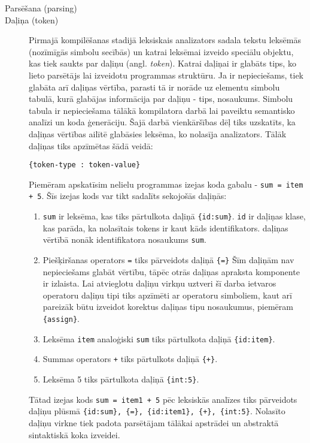 \begin{description}
\item[Parsēšana (parsing)]


\item[Daļiņa (token)]
Pirmajā kompilēšanas stadijā leksiskais analizators sadala tekstu leksēmās (nozīmīgās simbolu secībās) un katrai leksēmai izveido speciālu objektu, kas tiek saukts par daļiņu (angl. \emph{token}). Katrai daļiņai ir glabāts tips, ko lieto parsētājs lai izveidotu programmas struktūru. Ja ir nepieciešams, tiek glabāta arī daļiņas vērtība, parasti tā ir norāde uz elementu simbolu tabulā, kurā glabājas informācija par daļiņu - tips, nosaukums. Simbolu tabula ir nepieciešama tālākā kompilatora darbā lai paveiktu semantisko analīzi un koda ģenerāciju. Šajā darbā vienkāršības dēļ tiks uzskatīts, ka daļiņas vērtības ailītē glabāsies leksēma, ko nolasīja analizators. Tālāk daļiņas tiks apzīmētas šādā veidā:

\begin{verbatim}
{token-type : token-value}
\end{verbatim}

Piemēram apskatīsim nelielu programmas izejas koda gabalu - \verb|sum = item + 5|. Šīs izejas kods var tikt sadalīts sekojošās daļiņās:
\begin{enumerate}
\item \verb|sum| ir leksēma, kas tiks pārtulkota daļiņā \verb|{id:sum}|. \verb|id| ir daļiņas klase, kas parāda, ka nolasītais tokens ir kaut kāds identifikators. daļiņas vērtībā nonāk identifikatora nosaukums \verb|sum|.
\item Piešķiršanas operators \verb|=| tiks pārveidots daļiņā \verb|{=}| Šīm daļiņām nav nepieciešams glabāt vērtību, tāpēc otrās daļiņas apraksta komponente ir izlaista. Lai atvieglotu daļiņu virkņu uztveri šī darba ietvaros operatoru daļiņu tipi tiks apzīmēti ar operatoru simboliem, kaut arī pareizāk būtu izveidot korektus daļiņas tipu nosaukumus, piemēram \verb|{assign}|.
\item Leksēma \verb|item| analoģiski \verb|sum| tiks pārtulkota daļiņā \verb|{id:item}|.
\item Summas operators \verb|+| tiks pārtulkots daļiņā \verb|{+}|.
\item Leksēma 5 tiks pārtulkota daļiņā \verb|{int:5}|.
\end{enumerate}

Tātad izejas kods \verb|sum = item1 + 5| pēc leksiskās analīzes tiks pārveidots daļiņu plūsmā \verb|{id:sum}, {=}, {id:item1}, {+}, {int:5}|. Nolasīto daļiņu virkne tiek padota parsētājam tālākai apstrādei un abstraktā sintaktiskā koka izveidei. \cite{DragonBook}



\end{description}